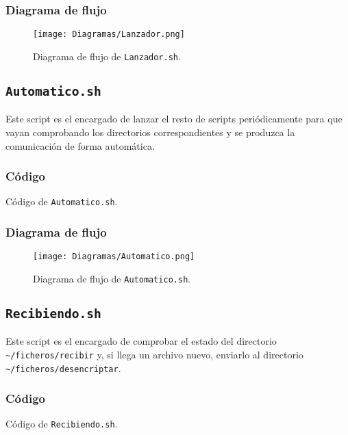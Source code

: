 \documentclass[12pt,letterpaper]{article}
\begin{document}
\newpage
\subsubsection{Diagrama de flujo}
\begin{figure}[h]
	\centering
	\texttt{[image: Diagramas/Lanzador.png]}
	\caption{Diagrama de flujo de \texttt{Lanzador.sh}.}
	\label{Diagrama de flujo de Lanzador.sh}
\end{figure}

\subsection{\texttt{Automatico.sh}}
Este script es el encargado de lanzar el resto de scripts periódicamente para que vayan comprobando los directorios correspondientes y se produzca la comunicación de forma automática.

\subsubsection{Código}

\begin{center}
	Código de \texttt{Automatico.sh}.
\end{center}

\newpage
\subsubsection{Diagrama de flujo}
\begin{figure}[h]
	\centering
	\texttt{[image: Diagramas/Automatico.png]}
	\caption{Diagrama de flujo de \texttt{Automatico.sh}.}
	\label{Diagrama de flujo de Automatico.sh}
\end{figure}

\subsection{\texttt{Recibiendo.sh}}
Este script es el encargado de comprobar el estado del directorio \texttt{\textasciitilde/ficheros/recibir} y, si llega un archivo nuevo, enviarlo al directorio \texttt{\textasciitilde/ficheros/desencriptar}.

\subsubsection{Código}

\begin{center}
	Código de \texttt{Recibiendo.sh}.
\end{center}
\end{document}
